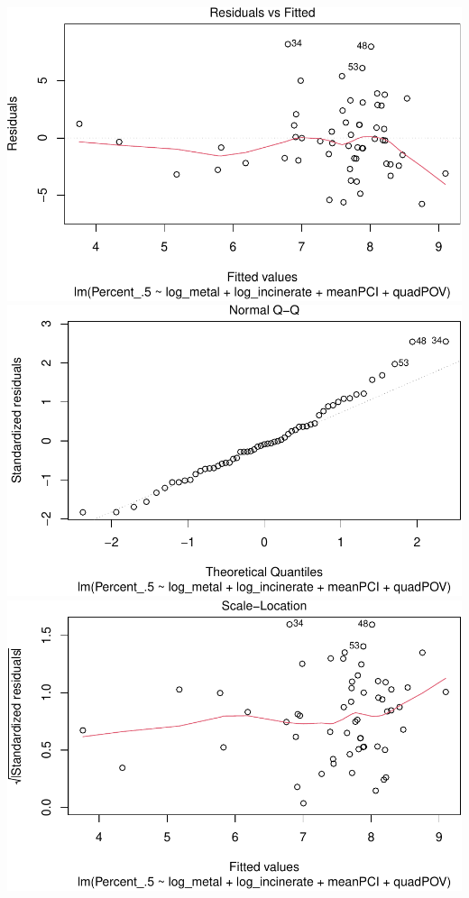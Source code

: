 \documentclass[
  12pt,
]{article}
\begin{document}
\includegraphics{Alcorn_Bao_Hermanson_ENV872_Project_files/figure-latex/analysis tools2-1.pdf}
\includegraphics{Alcorn_Bao_Hermanson_ENV872_Project_files/figure-latex/analysis tools2-2.pdf}
\includegraphics{Alcorn_Bao_Hermanson_ENV872_Project_files/figure-latex/analysis tools2-3.pdf}
\end{document}
